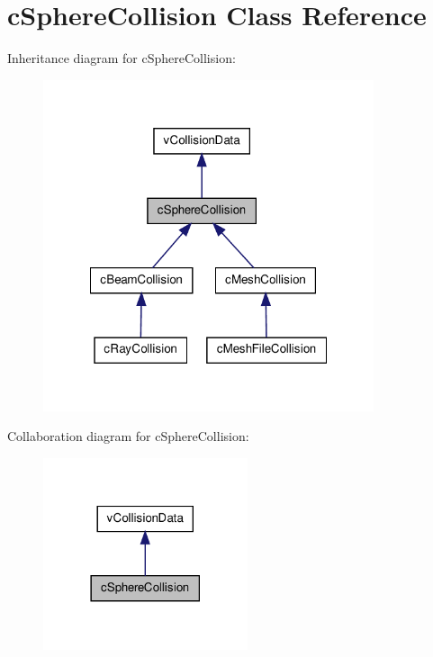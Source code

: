 \hypertarget{classc_sphere_collision}{
\section{cSphereCollision Class Reference}
\label{classc_sphere_collision}
}


Inheritance diagram for cSphereCollision:
\nopagebreak
\begin{figure}[H]
\begin{center}
\leavevmode
\includegraphics[width=275pt]{classc_sphere_collision__inherit__graph}
\end{center}
\end{figure}


Collaboration diagram for cSphereCollision:
\nopagebreak
\begin{figure}[H]
\begin{center}
\leavevmode
\includegraphics[width=170pt]{classc_sphere_collision__coll__graph}
\end{center}
\end{figure}
